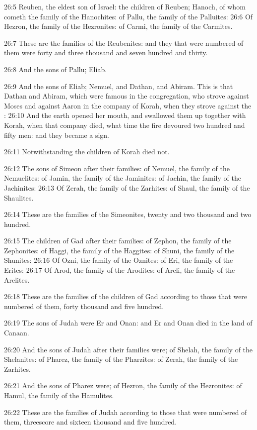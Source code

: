 26:5 Reuben, the eldest son of Israel: the children of Reuben; Hanoch, of whom cometh the family of the Hanochites: of Pallu, the family of the Palluites: 26:6 Of Hezron, the family of the Hezronites: of Carmi, the family of the Carmites.

26:7 These are the families of the Reubenites: and they that were numbered of them were forty and three thousand and seven hundred and thirty.

26:8 And the sons of Pallu; Eliab.

26:9 And the sons of Eliab; Nemuel, and Dathan, and Abiram. This is that Dathan and Abiram, which were famous in the congregation, who strove against Moses and against Aaron in the company of Korah, when they strove against the \LORD: 26:10 And the earth opened her mouth, and swallowed them up together with Korah, when that company died, what time the fire devoured two hundred and fifty men: and they became a sign.

26:11 Notwithstanding the children of Korah died not.

26:12 The sons of Simeon after their families: of Nemuel, the family of the Nemuelites: of Jamin, the family of the Jaminites: of Jachin, the family of the Jachinites: 26:13 Of Zerah, the family of the Zarhites: of Shaul, the family of the Shaulites.

26:14 These are the families of the Simeonites, twenty and two thousand and two hundred.

26:15 The children of Gad after their families: of Zephon, the family of the Zephonites: of Haggi, the family of the Haggites: of Shuni, the family of the Shunites: 26:16 Of Ozni, the family of the Oznites: of Eri, the family of the Erites: 26:17 Of Arod, the family of the Arodites: of Areli, the family of the Arelites.

26:18 These are the families of the children of Gad according to those that were numbered of them, forty thousand and five hundred.

26:19 The sons of Judah were Er and Onan: and Er and Onan died in the land of Canaan.

26:20 And the sons of Judah after their families were; of Shelah, the family of the Shelanites: of Pharez, the family of the Pharzites: of Zerah, the family of the Zarhites.

26:21 And the sons of Pharez were; of Hezron, the family of the Hezronites: of Hamul, the family of the Hamulites.

26:22 These are the families of Judah according to those that were numbered of them, threescore and sixteen thousand and five hundred.

